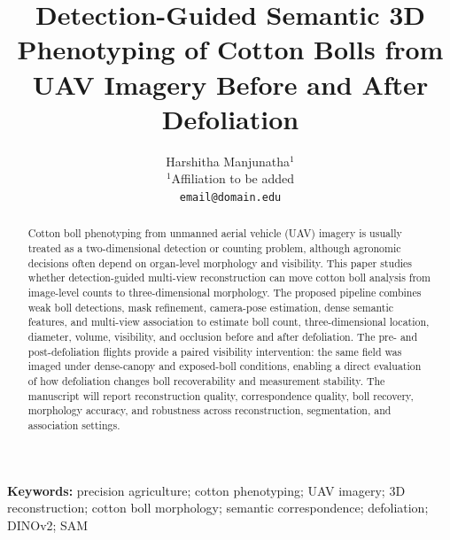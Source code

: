\documentclass[11pt]{article}
\title{Detection-Guided Semantic 3D Phenotyping of Cotton Bolls from UAV Imagery Before and After Defoliation}
\author{
Harshitha Manjunatha$^{1}$ \\
$^{1}$Affiliation to be added \\
\texttt{email@domain.edu}
}
\date{}
\begin{document}
\maketitle

\begin{abstract}
Cotton boll phenotyping from unmanned aerial vehicle (UAV) imagery is usually treated as a two-dimensional detection or counting problem, although agronomic decisions often depend on organ-level morphology and visibility. This paper studies whether detection-guided multi-view reconstruction can move cotton boll analysis from image-level counts to three-dimensional morphology. The proposed pipeline combines weak boll detections, mask refinement, camera-pose estimation, dense semantic features, and multi-view association to estimate boll count, three-dimensional location, diameter, volume, visibility, and occlusion before and after defoliation. The pre- and post-defoliation flights provide a paired visibility intervention: the same field was imaged under dense-canopy and exposed-boll conditions, enabling a direct evaluation of how defoliation changes boll recoverability and measurement stability. The manuscript will report reconstruction quality, correspondence quality, boll recovery, morphology accuracy, and robustness across reconstruction, segmentation, and association settings.
\end{abstract}

\textbf{Keywords:} precision agriculture; cotton phenotyping; UAV imagery; 3D reconstruction; cotton boll morphology; semantic correspondence; defoliation; DINOv2; SAM










\end{document}
